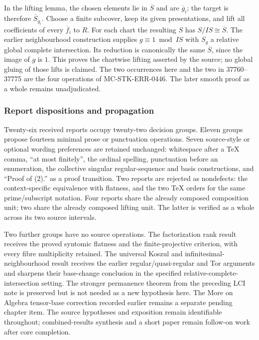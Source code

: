 In the lifting lemma, the chosen elements lie in \(\overline S\) and are \(\overline g_i\); the target is therefore \(\overline S_{\overline g_i}\). Choose a finite subcover, keep its given presentations, and lift all coefficients of every \(\overline f_i\) to \(R\). For each chart the resulting \(S\) has \(S/IS\cong\overline S\). The earlier neighbourhood construction supplies \(g\equiv1\bmod IS\) with \(S_g\) a relative global complete intersection. Its reduction is canonically the same \(\overline S\), since the image of \(g\) is \(1\). This proves the chartwise lifting asserted by the source; no global gluing of those lifts is claimed. The two occurrences here and the two in 37760--37775 are the four operations of MC-STK-ERR-0446. The later smooth proof as a whole remains unadjudicated.

\subsubsection{Report dispositions and propagation}\label{algebra-proof-046-report-dispositions-and-propagation}

Twenty-six received reports occupy twenty-two decision groups. Eleven groups propose fourteen minimal prose or punctuation operations. Seven source-style or optional wording preferences are retained unchanged: whitespace after a TeX comma, ``at most finitely'', the ordinal spelling, punctuation before an enumeration, the collective singular regular-sequence and basis constructions, and ``Proof of (2).'' as a proof transition. Two reports are rejected as nondefects: the context-specific equivalence with flatness, and the two TeX orders for the same prime/subscript notation. Four reports share the already composed composition unit; two share the already composed lifting unit. The latter is verified as a whole across its two source intervals.

Two further groups have no source operations. The factorization rank result receives the proved syntomic flatness and the finite-projective criterion, with every fibre multiplicity retained. The universal Koszul and infinitesimal-neighbourhood result receives the earlier regular/quasi-regular and Tor arguments and sharpens their base-change conclusion in the specified relative-complete-intersection setting. The stronger permanence theorem from the preceding LCI note is preserved but is not needed as a new hypothesis here. The More on Algebra tensor-base correction recorded earlier remains a separate pending chapter item. The source hypotheses and exposition remain identifiable throughout; combined-results synthesis and a short paper remain follow-on work after core completion.

